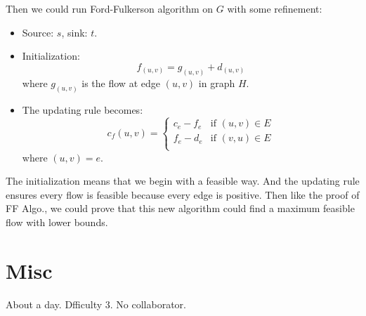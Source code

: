 \documentclass{article}
\begin{document}
Then we could run Ford-Fulkerson algorithm on $G$ with some refinement:
\begin{itemize}
	\item 
		Source: $s$, sink:  $t$.
	\item
		Initialization:
		\[
			f_{(u,v)}=g_{(u,v)}+d_{(u,v)}
		\] where $g_{(u,v)}$ is the flow at edge $(u,v)$ in graph  $H$.
	\item
		The updating rule becomes:
		\[
			c_f(u,v)=
		    \begin{cases}
			    c_e-f_e & \text{if } (u,v)\in E \\
			    f_e-d_e & \text{if } (v,u)\in E \\
		    \end{cases}
	    \] where $(u,v)=e$.
\end{itemize}
The initialization means that we begin with a feasible way.
And the updating rule ensures every flow is feasible because every edge is positive.
Then like the proof of FF Algo., we could prove that this new algorithm could find a maximum feasible flow with lower bounds.

\section{Misc}
About a day. Dfficulty 3. No collaborator.
\end{document}
